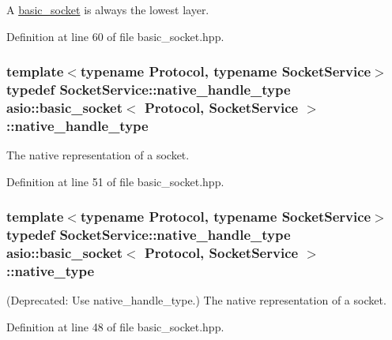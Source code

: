 A \hyperlink{classasio_1_1basic__socket}{basic\+\_\+socket} is always the lowest layer. 



Definition at line 60 of file basic\+\_\+socket.\+hpp.

\hypertarget{classasio_1_1basic__socket_a3481ac06d51afa0cb23f09cd39ac64eb}{}
\subsubsection[{native\+\_\+handle\+\_\+type}]{\setlength{\rightskip}{0pt plus 5cm}template$<$typename Protocol, typename Socket\+Service$>$ typedef Socket\+Service\+::native\+\_\+handle\+\_\+type {\bf asio\+::basic\+\_\+socket}$<$ Protocol, Socket\+Service $>$\+::{\bf native\+\_\+handle\+\_\+type}}\label{classasio_1_1basic__socket_a3481ac06d51afa0cb23f09cd39ac64eb}


The native representation of a socket. 



Definition at line 51 of file basic\+\_\+socket.\+hpp.

\hypertarget{classasio_1_1basic__socket_a51a45a62e006c34758eff7a409f57eda}{}
\subsubsection[{native\+\_\+type}]{\setlength{\rightskip}{0pt plus 5cm}template$<$typename Protocol, typename Socket\+Service$>$ typedef Socket\+Service\+::native\+\_\+handle\+\_\+type {\bf asio\+::basic\+\_\+socket}$<$ Protocol, Socket\+Service $>$\+::{\bf native\+\_\+type}}\label{classasio_1_1basic__socket_a51a45a62e006c34758eff7a409f57eda}
(Deprecated\+: Use native\+\_\+handle\+\_\+type.) The native representation of a socket. 

Definition at line 48 of file basic\+\_\+socket.\+hpp.

\hypertarget{classasio_1_1basic__socket_a5890addc84762c67f2b3f1723428721d}{}
